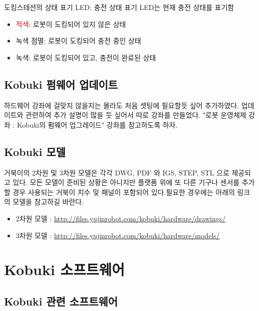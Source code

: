 \noindent
[참고사항] 
도킹스테션의 상태 표기 LED: 충전 상태 표기 LED는 현재 충전 상태를 표기함
\begin{itemize}[leftmargin=*]
\item\textcolor{red}{적색}: 로봇이 도킹되어 있지 않은 상태
\item{\color{limegreen}녹색 점멸}: 로봇이 도킹되어 충전 중인 상태
\item{\color{limegreen}녹색}: 로봇이 도킹되어 있고, 충전이 완료된 상태
\end{itemize}

\subsection{Kobuki 펌웨어 업데이트}

하드웨어 강좌에 걸맞지 않을지는 몰라도 처음 셋팅에 필요할듯 싶어 추가하였다. 업데이트와 관련하여 추가 설명이 많을 듯 싶어서 따로 강좌를 만들었다. "로봇 운영체제 강좌 : Kobuki의 펌웨어 업그레이드" 강좌를 참고하도록 하자.

\subsection{Kobuki 모델}

거북이의 2차원 및 3차원 모델은 각각 DWG, PDF 와 IGS, STEP, STL 으로 제공되고 있다. 모든 모델이 준비된 상황은 아니지만 플랫폼 위에 또 다른 기구나 센서를 추가할 경우 사용되는 거북이 치수 및 패널이 포함되어 있다.필요한 경우에는 아래의 링크의 모델을 참고하길 바란다.

\begin{itemize}[leftmargin=*]
\item 2차원 모델 : \url{http://files.yujinrobot.com/kobuki/hardware/drawings/}
\item 3차원 모델 : \url{http://files.yujinrobot.com/kobuki/hardware/models/}
\end{itemize}

\section{Kobuki 소프트웨어}

\subsection{Kobuki 관련 소프트웨어}

